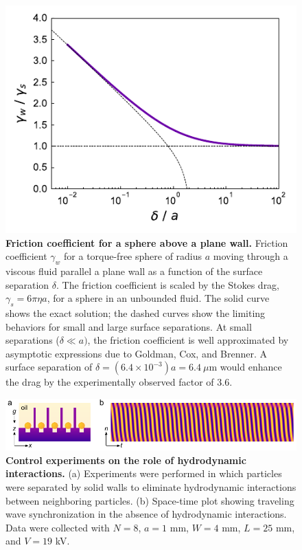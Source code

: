 \begin{appendices}
\begin{figure}[p]
    \centering
    \includegraphics{figures/A2_drafCoefficient.pdf}
    \caption{\textbf{Friction coefficient for a sphere above a plane wall.} Friction coefficient $\gamma_w$ for a torque-free sphere of radius $a$ moving through a viscous fluid parallel a plane wall as a function of the surface separation $\delta$.  The friction coefficient is scaled by the Stokes drag, $\gamma_s=6\pi \eta a$, for a sphere in an unbounded fluid.  The solid curve shows the exact solution\autocite{ONeill1964a,Dean1963}; the dashed curves show the limiting behaviors for small and large surface separations.  At small separations ($\delta\ll a)$, the friction coefficient is well approximated by asymptotic expressions due to Goldman, Cox, and Brenner\autocite{Goldman1967a}.  A surface separation of $\delta = (6.4\times10^{-3})a=6.4~\mu$m would enhance the drag by the experimentally observed factor of 3.6.}
    \label{fig:SI6}
\end{figure}


\begin{figure}[p]
    \centering
    \includegraphics{figures/A2_SI5-v2.pdf}
    \caption{\textbf{Control experiments on the role of hydrodynamic interactions.} (a) Experiments were performed in which particles were separated by solid walls to eliminate hydrodynamic interactions between neighboring particles. (b) Space-time plot showing traveling wave synchronization in the absence of hydrodynamic interactions. Data were collected with  $N=8$, $a=1$ mm, $W=4$ mm, $L=25$ mm, and $V=19$ kV.}
    \label{fig:SI6}
\end{figure}


\end{appendices}
